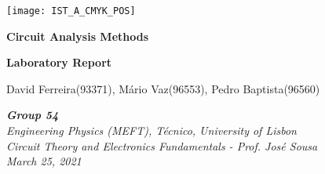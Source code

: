 
\thispagestyle {empty}

\texttt{[image: IST\_A\_CMYK\_POS]}

\begin{center}
%
\vspace{1.0cm}
\begin{center}\Large\textbf{Circuit Analysis Methods}\end{center}
\begin{center}\large\textbf{Laboratory Report}\end{center}

\begin{center} David Ferreira(93371), Mário Vaz(96553), Pedro Baptista(96560)\end{center}

\begin{center} \textit {\textbf{Group 54} \\Engineering Physics (MEFT), Técnico, University of Lisbon\\ Circuit Theory and Electronics Fundamentals - \small Prof. José Sousa\\March 25, 2021}\end{center}
%
\end{center}

